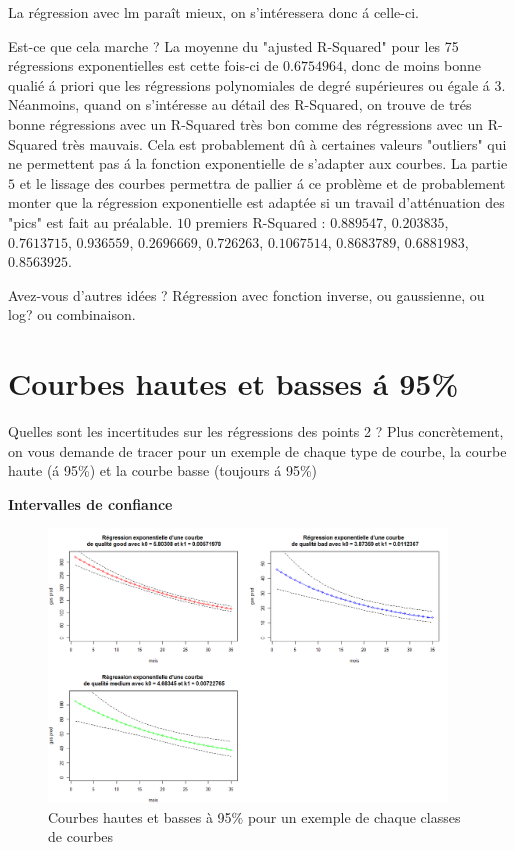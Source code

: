 \documentclass[12pt]{article}
\begin{document}
La r\'egression avec lm para\^it mieux, on s'int\'eressera donc \'a celle-ci.

Est-ce que cela marche ? 
La moyenne du "ajusted R-Squared" pour les 75 r\'egressions exponentielles est cette fois-ci de $0.6754964$, donc de moins bonne quali\'e \'a priori que les r\'egressions polynomiales de degr\'e sup\'erieures ou \'egale \'a $3$. N\'eanmoins, quand on s'int\'eresse au d\'etail des R-Squared, on trouve de tr\'es bonne r\'egressions avec un R-Squared tr\`es bon comme des r\'egressions avec un R-Squared tr\`es mauvais. Cela est probablement d\^u à certaines valeurs "outliers" qui ne permettent pas \'a la fonction exponentielle de s'adapter aux courbes. La partie $5$ et le lissage des courbes permettra de pallier \'a ce probl\`eme et de probablement monter que la r\'egression exponentielle est adapt\'ee si un travail d'att\'enuation des "pics" est fait au pr\'ealable.
$10$ premiers R-Squared : $0.889547$, $0.203835$, $0.7613715$, $0.936559$, $0.2696669$, $0.726263$, $0.1067514$, $0.8683789$, $0.6881983$, $0.8563925$.

Avez-vous d'autres id\'ees ?
R\'egression avec fonction inverse, ou gaussienne, ou log? ou combinaison.

\newpage

\section{Courbes hautes et basses \'a 95\%}

Quelles sont les incertitudes sur les r\'egressions des points 2 ? Plus concr\`etement, on
vous demande de tracer pour un exemple de chaque type de courbe, la courbe haute (\'a
95\%) et la courbe basse (toujours \'a 95\%)

\textbf{Intervalles de confiance}

\begin{figure}[H]
 \centering %
	\includegraphics[width=400px]{q3_predict_nls}
  \caption{\label{fig:q3_predict_nls} Courbes hautes et basses à 95\% pour un exemple de chaque classes de courbes}
\end{figure}
\end{document}

